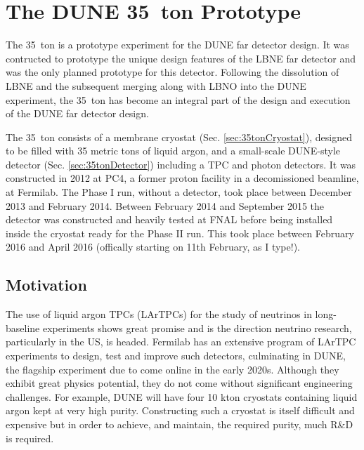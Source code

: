 
\graphicspath{{35ton/Figs/}}

\chapter{The DUNE 35~ton Prototype}\label{chap:35ton}

The 35~ton is a prototype experiment for the DUNE far detector design.  It was contructed to prototype the unique design features of the LBNE far detector and was the only planned prototype for this detector.  Following the dissolution of LBNE and the subsequent merging along with LBNO into the DUNE experiment, the 35~ton has become an integral part of the design and execution of the DUNE far detector design.

The 35~ton consists of a membrane cryostat (Sec. \ref{sec:35tonCryostat}), designed to be filled with 35 metric tons of liquid argon, and a small-scale DUNE-style detector (Sec. \ref{sec:35tonDetector}) including a TPC and photon detectors.  It was constructed in 2012 at PC4, a former proton facility in a decomissioned beamline, at Fermilab.  The Phase I run, without a detector, took place between December 2013 and February 2014.  Between February 2014 and September 2015 the detector was constructed and heavily tested at FNAL before being installed inside the cryostat ready for the Phase II run.  This took place between February 2016 and April 2016 (offically starting on 11th February, as I type!).

\section{Motivation}\label{sec:35tonMotivation}

The use of liquid argon TPCs (LArTPCs) for the study of neutrinos in long-baseline experiments shows great promise and is the direction neutrino research, particularly in the US, is headed.  Fermilab has an extensive program of LArTPC experiments to design, test and improve such detectors, culminating in DUNE, the flagship experiment due to come online in the early 2020s.  Although they exhibit great physics potential, they do not come without significant engineering challenges.  For example, DUNE will have four 10 kton cryostats containing liquid argon kept at very high purity.  Constructing such a cryostat is itself difficult and expensive but in order to achieve, and maintain, the required purity, much R\&D is required.

